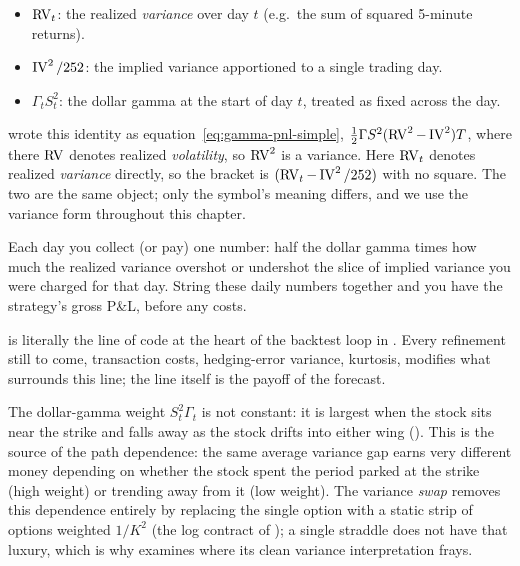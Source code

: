 \begin{itemize}
  \item $\operatorname{RV}_t$: the realized \emph{variance} over day $t$ (e.g.\ the sum of squared 5-minute returns).
  \item $\operatorname{IV}^2/252$: the implied variance apportioned to a single trading day.
  \item $\Gamma_t S_t^2$: the dollar gamma at the start of day $t$, treated as fixed across the day.
\end{itemize}

\begin{warning}
 wrote this identity as equation~\eqref{eq:gamma-pnl-simple}, $\tfrac12\Gamma S^2(\operatorname{RV}^2 - \operatorname{IV}^2)T$, where there $\operatorname{RV}$ denotes realized \emph{volatility}, so $\operatorname{RV}^2$ is a variance. Here $\operatorname{RV}_t$ denotes realized \emph{variance} directly, so the bracket is $(\operatorname{RV}_t - \operatorname{IV}^2/252)$ with no square. The two are the same object; only the symbol's meaning differs, and we use the variance form throughout this chapter.
\end{warning}

\begin{intuition}
Each day you collect (or pay) one number: half the dollar gamma times how much the realized variance overshot or undershot the slice of implied variance you were charged for that day. String these daily numbers together and you have the strategy's gross P\&L, before any costs.
\end{intuition}

\begin{projectconnection}
 is literally the line of code at the heart of the backtest loop in . Every refinement still to come, transaction costs, hedging-error variance, kurtosis, modifies what surrounds this line; the line itself is the payoff of the forecast.
\end{projectconnection}

The dollar-gamma weight $S_t^2\Gamma_t$ is not constant: it is largest when the stock sits near the strike and falls away as the stock drifts into either wing (). This is the source of the path dependence: the same average variance gap earns very different money depending on whether the stock spent the period parked at the strike (high weight) or trending away from it (low weight). The variance \emph{swap} removes this dependence entirely by replacing the single option with a static strip of options weighted $1/K^2$ (the log contract of ); a single straddle does not have that luxury, which is why  examines where its clean variance interpretation frays.

